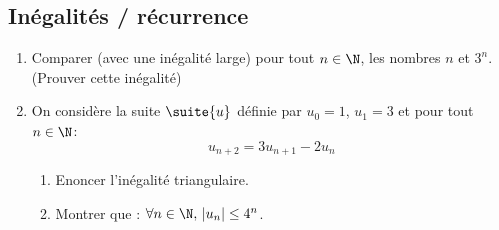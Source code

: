 \subsection{Inégalités / récurrence}
\begin{exercice}
\begin{enumerate}
\item Comparer (avec une inégalité large) pour tout $n\in \N$, les nombres $n$ et $ 3^n$. (Prouver cette inégalité) 
\item On considère la suite $\suite{u}$ définie par $u_0=1$, $u_1= 3$  et pour tout $n\in \N$:
$$u_{n+2} =3u_{n+1} -2u_n$$
\begin{enumerate}
\item Enoncer l'inégalité triangulaire.
\item Montrer que  : $\forall n\in \N,\, |u_n| \leq 4^n$. 
\end{enumerate}
\end{enumerate}
\end{exercice}


